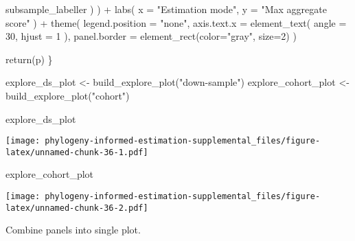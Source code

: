 \documentclass[
]{book}
\newenvironment{Shaded}{\begin{snugshade}}{\end{snugshade}}
\newcommand{\AttributeTok}[1]{\textcolor[rgb]{0.77,0.63,0.00}{#1}}
\newcommand{\DecValTok}[1]{\textcolor[rgb]{0.00,0.00,0.81}{#1}}
\newcommand{\FunctionTok}[1]{\textcolor[rgb]{0.00,0.00,0.00}{#1}}
\newcommand{\NormalTok}[1]{#1}
\newcommand{\OtherTok}[1]{\textcolor[rgb]{0.56,0.35,0.01}{#1}}
\newcommand{\SpecialCharTok}[1]{\textcolor[rgb]{0.00,0.00,0.00}{#1}}
\newcommand{\StringTok}[1]{\textcolor[rgb]{0.31,0.60,0.02}{#1}}
\begin{document}
\begin{Shaded}
\begin{Highlighting}[]
\NormalTok{      subsample\_labeller}
\NormalTok{    )}
\NormalTok{    ) }\SpecialCharTok{+}
    \FunctionTok{labs}\NormalTok{(}
      \AttributeTok{x =} \StringTok{"Estimation mode"}\NormalTok{,}
      \AttributeTok{y =} \StringTok{"Max aggregate score"}
\NormalTok{    ) }\SpecialCharTok{+}
    \FunctionTok{theme}\NormalTok{(}
      \AttributeTok{legend.position =} \StringTok{"none"}\NormalTok{,}
      \AttributeTok{axis.text.x =} \FunctionTok{element\_text}\NormalTok{(}
        \AttributeTok{angle =} \DecValTok{30}\NormalTok{,}
        \AttributeTok{hjust =} \DecValTok{1}
\NormalTok{      ),}
      \AttributeTok{panel.border =} \FunctionTok{element\_rect}\NormalTok{(}\AttributeTok{color=}\StringTok{"gray"}\NormalTok{, }\AttributeTok{size=}\DecValTok{2}\NormalTok{)}
\NormalTok{    )}

  \FunctionTok{return}\NormalTok{(p)}
\NormalTok{\}}

\NormalTok{explore\_ds\_plot }\OtherTok{\textless{}{-}} \FunctionTok{build\_explore\_plot}\NormalTok{(}\StringTok{"down{-}sample"}\NormalTok{)}
\NormalTok{explore\_cohort\_plot }\OtherTok{\textless{}{-}} \FunctionTok{build\_explore\_plot}\NormalTok{(}\StringTok{"cohort"}\NormalTok{)}

\NormalTok{explore\_ds\_plot}
\end{Highlighting}
\end{Shaded}

\texttt{[image: phylogeny-informed-estimation-supplemental\_files/figure-latex/unnamed-chunk-36-1.pdf]}

\begin{Shaded}
\begin{Highlighting}[]
\NormalTok{explore\_cohort\_plot}
\end{Highlighting}
\end{Shaded}

\texttt{[image: phylogeny-informed-estimation-supplemental\_files/figure-latex/unnamed-chunk-36-2.pdf]}

Combine panels into single plot.
\end{document}
